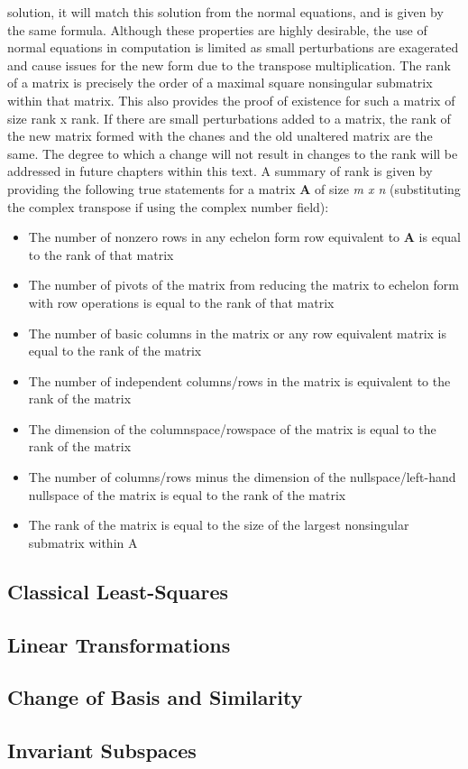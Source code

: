 \documentclass[12pt]{article}
\begin{document}
solution, it will match this solution from the normal equations, and is given by the same formula. Although these properties are highly desirable, the use of normal equations in computation 
is limited as small perturbations are exagerated and cause issues for the new form due to the transpose multiplication. 
\newline
\newline
The rank of a matrix is precisely the order of a maximal square nonsingular submatrix within that matrix. This also provides the proof of existence for such a matrix of size rank x rank. If 
there are small perturbations added to a matrix, the rank of the new matrix formed with the chanes and the old unaltered matrix are the same. The degree to which a change will not result in 
changes to the rank will be addressed in future chapters within this text. 
\newline
\newline
A summary of rank is given by providing the following true statements for a matrix \textbf{A} of size \textit{m x n} (substituting the complex transpose if using the complex number field):
\begin{itemize}
    \item The number of nonzero rows in any echelon form row equivalent to \textbf{A} is equal to the rank of that matrix
    \item The number of pivots of the matrix from reducing the matrix to echelon form with row operations is equal to the rank of that matrix
    \item The number of basic columns in the matrix or any row equivalent matrix is equal to the rank of the matrix
    \item The number of independent columns/rows in the matrix is equivalent to the rank of the matrix
    \item The dimension of the columnspace/rowspace of the matrix is equal to the rank of the matrix
    \item The number of columns/rows minus the dimension of the nullspace/left-hand nullspace of the matrix is equal to the rank of the matrix
    \item The rank of the matrix is equal to the size of the largest nonsingular submatrix within A
\end{itemize}


\subsection{Classical Least-Squares}
\subsection{Linear Transformations}
\subsection{Change of Basis and Similarity}
\subsection{Invariant Subspaces}
\end{document}
